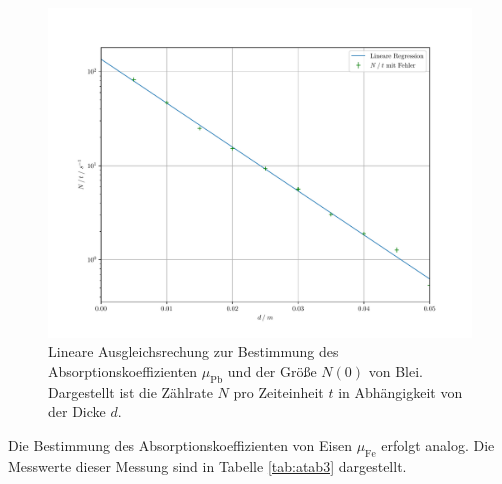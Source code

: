 \FloatBarrier
\begin{figure}[h]
    \centering
    \includegraphics[width=13.5cm]{content/blei.pdf}
    \caption{Lineare Ausgleichsrechung zur Bestimmung des Absorptionskoeffizienten $\mu_\text{Pb}$ und der Größe $N\left(0\right)$ von Blei. 
    Dargestellt ist die Zählrate $N$ pro Zeiteinheit $t$ in Abhängigkeit von der Dicke $d$.}
    \label{fig:afig1}
\end{figure}
\FloatBarrier
\noindent

Die Bestimmung des Absorptionskoeffizienten von Eisen $\mu_\text{Fe}$ erfolgt analog. Die Messwerte dieser Messung sind
in Tabelle \ref{tab:atab3} dargestellt.

